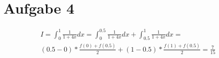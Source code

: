 \section*{Aufgabe 4}

\begin{align*}
	I = \int_0^1 \frac{1}{1+4x} dx = \int_0^{0.5} \frac{1}{1+4x} dx +\int_{0.5}^{1} \frac{1}{1+4x} dx = \\ (0.5 - 0) * \frac{f(0) + f(0.5)}{2} + (1 - 0.5) * \frac{f(1) + f(0.5)}{2} = \frac{7}{15}
\end{align*}
